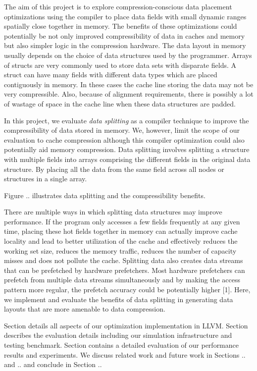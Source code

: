 The aim of this project is  to explore compression-conscious data placement
optimizations using the compiler to place data fields with small dynamic ranges
spatially close together in memory. The benefits of these optimizations could
potentially be not only improved compressibility of data in caches and memory
but also simpler logic in the compression hardware. The data layout in memory
usually depends on the choice of data structures used by the programmer. Arrays
of structs are very commonly used to store data sets with disparate fields. A
struct can have many fields with different data types which are placed
contiguously in memory. In these cases the cache line storing the data may not
be very compressible. Also, because of alignment requirements, there is possibly
a lot of wastage of space in the cache line when these data structures are
padded.  

In this project, we evaluate {\em data splitting}  as a compiler technique to
improve the compressibility of data stored in memory. We, however, limit the
scope of our evaluation to cache compression although this compiler optimization
could also potentially aid memory compression. Data splitting involves splitting
a structure with multiple fields into arrays comprising the different fields in
the original data structure. By placing all the data from the same field across
all nodes or structures in a single array.

Figure .. illustrates data splitting and the compressibility benefits. 

There are multiple ways in which splitting data structures may improve
performance. If the program only accesses a few fields frequently at any given
time, placing these hot fields together in memory can actually improve cache
locality and lead to better utilization of the cache and effectively reduces the
working set size, reduces the memory traffic, reduces the number of capacity
misses and does not pollute the cache. Splitting data also creates data streams
that can be prefetched by hardware prefetchers. Most hardware prefetchers can
prefetch from multiple data streams simultaneously and by making the access
pattern more regular, the prefetch accuracy could be potentially higher [1].
Here, we implement and evaluate the benefits of data splitting in generating
data layouts that are more amenable to data compression.

Section details all aspects of our optimization implementation in LLVM. Section
describes the evaluation details including our simulation infrastructure and
testing benchmark.  Section contains a detailed evaluation of our performance
results and experiments.  We discuss related work and future work in Sections ..
and .. and conclude in Section ..
